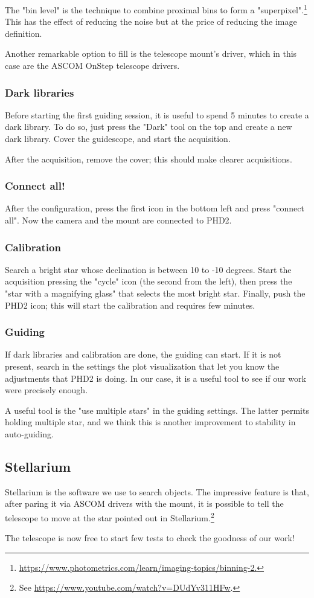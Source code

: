 The "bin level" is the technique to combine proximal bins to form a "superpixel".\footnote{\url{https://www.photometrics.com/learn/imaging-topics/binning-2.}}
This has the effect of reducing the noise but at the price of reducing the image definition.

Another remarkable option to fill is the telescope mount's driver, which in this case are the ASCOM OnStep telescope drivers.

\subsubsection{Dark libraries}
Before starting the first guiding session, it is useful to spend 5 minutes to create a dark library.
To do so, just press the "Dark" tool on the top and create a new dark library.
Cover the guidescope, and start the acquisition.

After the acquisition, remove the cover;
this should make clearer acquisitions.

\subsubsection{Connect all!}
After the configuration, press the first icon in the bottom left and press "connect all".
Now the camera and the mount are connected to PHD2.

\subsubsection{Calibration}
Search a bright star whose declination is between 10 to -10 degrees.
Start the acquisition pressing the "cycle" icon (the second from the left), then press the "star with a magnifying glass" that selects the most bright star.
Finally, push the PHD2 icon; this will start the calibration and requires few minutes.

\subsubsection{Guiding}
If dark libraries and calibration are done, the guiding can start.
If it is not present, search in the settings the plot visualization that let you know the adjustments that PHD2 is doing.
In our case, it is a useful tool to see if our work were precisely enough.        

A useful tool is the "use multiple stars" in the guiding settings.
The latter permits holding multiple star, and we think this is another improvement to stability in auto-guiding.


\subsection{Stellarium}
Stellarium is the software we use to search objects.
The impressive feature is that, after paring it via ASCOM drivers with the mount, it is possible to tell the telescope to move at the star pointed out in Stellarium.\footnote{See \url{https://www.youtube.com/watch?v=DUdYv311HFw}.}

The telescope is now free to start few tests to check the goodness of our work!